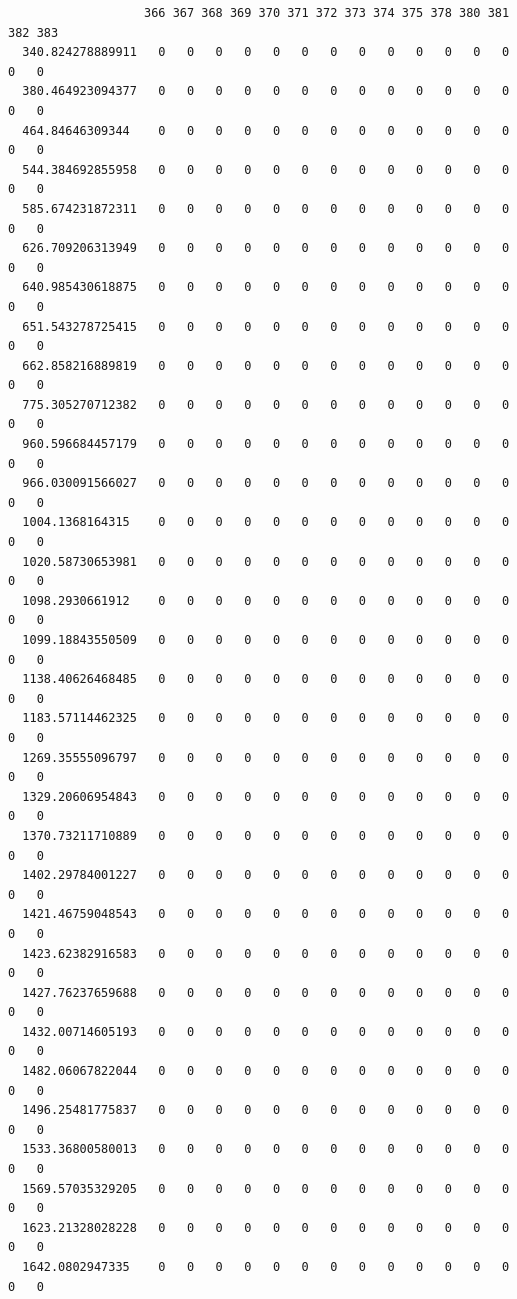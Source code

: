 \documentclass[
  letterpaper,
  DIV=11,
  numbers=noendperiod]{scrartcl}
\begin{document}
\begin{verbatim}
                   366 367 368 369 370 371 372 373 374 375 378 380 381 382 383
  340.824278889911   0   0   0   0   0   0   0   0   0   0   0   0   0   0   0
  380.464923094377   0   0   0   0   0   0   0   0   0   0   0   0   0   0   0
  464.84646309344    0   0   0   0   0   0   0   0   0   0   0   0   0   0   0
  544.384692855958   0   0   0   0   0   0   0   0   0   0   0   0   0   0   0
  585.674231872311   0   0   0   0   0   0   0   0   0   0   0   0   0   0   0
  626.709206313949   0   0   0   0   0   0   0   0   0   0   0   0   0   0   0
  640.985430618875   0   0   0   0   0   0   0   0   0   0   0   0   0   0   0
  651.543278725415   0   0   0   0   0   0   0   0   0   0   0   0   0   0   0
  662.858216889819   0   0   0   0   0   0   0   0   0   0   0   0   0   0   0
  775.305270712382   0   0   0   0   0   0   0   0   0   0   0   0   0   0   0
  960.596684457179   0   0   0   0   0   0   0   0   0   0   0   0   0   0   0
  966.030091566027   0   0   0   0   0   0   0   0   0   0   0   0   0   0   0
  1004.1368164315    0   0   0   0   0   0   0   0   0   0   0   0   0   0   0
  1020.58730653981   0   0   0   0   0   0   0   0   0   0   0   0   0   0   0
  1098.2930661912    0   0   0   0   0   0   0   0   0   0   0   0   0   0   0
  1099.18843550509   0   0   0   0   0   0   0   0   0   0   0   0   0   0   0
  1138.40626468485   0   0   0   0   0   0   0   0   0   0   0   0   0   0   0
  1183.57114462325   0   0   0   0   0   0   0   0   0   0   0   0   0   0   0
  1269.35555096797   0   0   0   0   0   0   0   0   0   0   0   0   0   0   0
  1329.20606954843   0   0   0   0   0   0   0   0   0   0   0   0   0   0   0
  1370.73211710889   0   0   0   0   0   0   0   0   0   0   0   0   0   0   0
  1402.29784001227   0   0   0   0   0   0   0   0   0   0   0   0   0   0   0
  1421.46759048543   0   0   0   0   0   0   0   0   0   0   0   0   0   0   0
  1423.62382916583   0   0   0   0   0   0   0   0   0   0   0   0   0   0   0
  1427.76237659688   0   0   0   0   0   0   0   0   0   0   0   0   0   0   0
  1432.00714605193   0   0   0   0   0   0   0   0   0   0   0   0   0   0   0
  1482.06067822044   0   0   0   0   0   0   0   0   0   0   0   0   0   0   0
  1496.25481775837   0   0   0   0   0   0   0   0   0   0   0   0   0   0   0
  1533.36800580013   0   0   0   0   0   0   0   0   0   0   0   0   0   0   0
  1569.57035329205   0   0   0   0   0   0   0   0   0   0   0   0   0   0   0
  1623.21328028228   0   0   0   0   0   0   0   0   0   0   0   0   0   0   0
  1642.0802947335    0   0   0   0   0   0   0   0   0   0   0   0   0   0   0

\end{verbatim}
\end{document}
